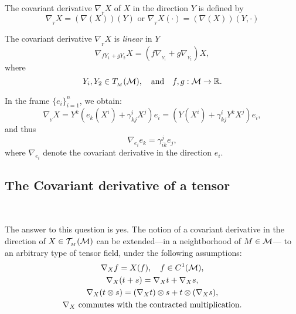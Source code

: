 \begin{definition}  
The covariant derivative $\nabla_{_{Y}}X$ of $X$ in the direction $Y$ is defined by
\begin{equation}
\nabla_{_{Y}}X=(\nabla(X))(Y)    \text{ or } \nabla_{_{Y}}X(\cdot)=(\nabla(X))(Y,\cdot) 
\end{equation}
\end{definition}

The covariant derivative $\nabla_{_{Y}}X$ is  \emph{linear} in $Y$
\[
\nabla_{{fY_{1}+gY_{2}}}X=(f\nabla_{_{Y_{1}}}+g\nabla_{_{Y_{2}}})X, \] where \[Y_{i},Y_{2}\in T_{_{M}}(\mathcal{M}),\quad \text{and}\quad f,g : \mathcal{M}\to \mathbb{R}.
\]

In the frame $\{e_{i}\}_{i=1}^{n}$, we obtain: 
\[
\nabla_{_{Y}}X=Y^{k}\left(e_{k}(X^{i}) + \gamma^{i}_{kj}X^{j}\right)e_{i}=\left(Y(X^{i}) + \gamma^{i}_{kj}Y^{k}X^{j}\right)e_{i},
\]
and thus 
\begin{equation}
\nabla_{e_{i}}e_{k}=  \gamma^{j}_{ik}e_{j},
\end{equation}
where $\nabla_{e_{i}}$ denote the covariant derivative  in the direction $e_i$.

\subsection{\bf The Covariant derivative of a tensor}

\, 

The answer to this question is yes. The notion of a covariant derivative in the  direction of $X\in \mathcal{T}_{_{M}}(\mathcal{M})$ can be extended---in a neightborhood of $M\in \mathcal{M}$--- to an arbitrary type of tensor field, under the following assumptions: 
\begin{subequations}\label{E:cdt}
\begin{gather}
 \nabla_{X}f=X(f),\quad f\in C^{1}( \mathcal{M}),\label{E:cdt1}\\
 \nabla_{X}(t+ s)= \nabla_{X}t +\nabla_{X}s,\label{E:cdt2}\\
\nabla_{X}(t\otimes s)= (\nabla_{X}t)\otimes s+ t\otimes (\nabla_{X}s),\label{E:cdt3}\\
\nabla_{X} \text{  commutes with the contracted multiplication.}\label{E:cdt4}
\end{gather}
\end{subequations}


